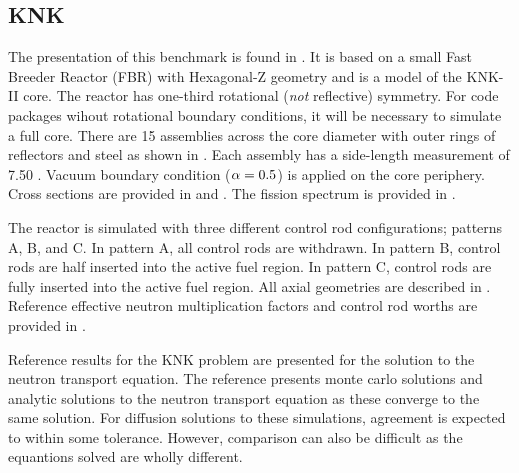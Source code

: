   \subsection{KNK}
    \label{sec:knk}
    The presentation of this benchmark is found in \cite{takedaBenchmark}. It is
    based on a small Fast Breeder Reactor (FBR) with Hexagonal-Z geometry and is
    a model of the KNK-II core. The reactor has one-third rotational
    (\textit{not} reflective) symmetry. For code packages wihout rotational
    boundary conditions, it will be necessary to simulate a full core. There are
    15 assemblies across the core diameter with outer rings of reflectors and
    steel as shown in . Each assembly has a side-length
    measurement of 7.50 . Vacuum boundary condition ($\alpha = 0.5$)
    is applied on the core periphery. Cross sections are provided in
     and . The fission spectrum is provided
    in .

    The reactor is simulated with three different control rod configurations;
    patterns A, B, and C. In pattern A, all control rods are withdrawn. In
    pattern B, control rods are half inserted into the active fuel region. In
    pattern C, control rods are fully inserted into the active fuel region. All
    axial geometries are described in . Reference
    effective neutron multiplication factors and control rod worths are provided
    in .

    Reference results for the KNK problem are presented for the solution to the
    neutron transport equation. The reference presents monte carlo solutions and
    analytic solutions to the neutron transport equation as these converge to
    the same solution. For diffusion solutions to these simulations, agreement
    is expected to within some tolerance. However, comparison can also be
    difficult as the equantions solved are wholly different.

